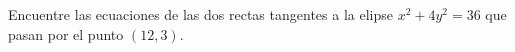 \item Encuentre las ecuaciones de las dos rectas tangentes a la elipse $x^2 + 4y^2 = 36$ que pasan por el punto $(12, 3)$.
